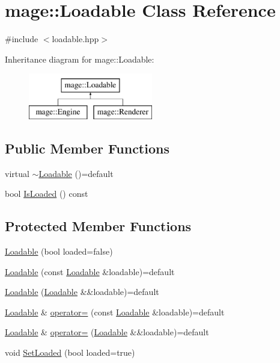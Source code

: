 \hypertarget{classmage_1_1_loadable}{}\section{mage\+:\+:Loadable Class Reference}
\label{classmage_1_1_loadable}


{\ttfamily \#include $<$loadable.\+hpp$>$}

Inheritance diagram for mage\+:\+:Loadable\+:\begin{figure}[H]
\begin{center}
\leavevmode
\includegraphics[height=2.000000cm]{classmage_1_1_loadable}
\end{center}
\end{figure}
\subsection*{Public Member Functions}
\begin{DoxyCompactItemize}
\item 
virtual \hyperlink{classmage_1_1_loadable_a7f51b5e1065ebe4dd1da7ef9c9966546}{$\sim$\+Loadable} ()=default
\item 
bool \hyperlink{classmage_1_1_loadable_a53cfa5beb9b44bbcda0d6166a54b8cb6}{Is\+Loaded} () const
\end{DoxyCompactItemize}
\subsection*{Protected Member Functions}
\begin{DoxyCompactItemize}
\item 
\hyperlink{classmage_1_1_loadable_afbdcb287b5e20583899a27a1c244bc7d}{Loadable} (bool loaded=false)
\item 
\hyperlink{classmage_1_1_loadable_a21364449c045d579cb6090347d83cd54}{Loadable} (const \hyperlink{classmage_1_1_loadable}{Loadable} \&loadable)=default
\item 
\hyperlink{classmage_1_1_loadable_ad5f3daaaa4902fe285513408ec92b832}{Loadable} (\hyperlink{classmage_1_1_loadable}{Loadable} \&\&loadable)=default
\item 
\hyperlink{classmage_1_1_loadable}{Loadable} \& \hyperlink{classmage_1_1_loadable_a82277616525b6ed9b1e19fd2dcdb4c0d}{operator=} (const \hyperlink{classmage_1_1_loadable}{Loadable} \&loadable)=default
\item 
\hyperlink{classmage_1_1_loadable}{Loadable} \& \hyperlink{classmage_1_1_loadable_adf203e75fa34f78e617fae0682be3444}{operator=} (\hyperlink{classmage_1_1_loadable}{Loadable} \&\&loadable)=default
\item 
void \hyperlink{classmage_1_1_loadable_a932ff8b287c8e68e30a13804cba08ff2}{Set\+Loaded} (bool loaded=true)
\end{DoxyCompactItemize}
